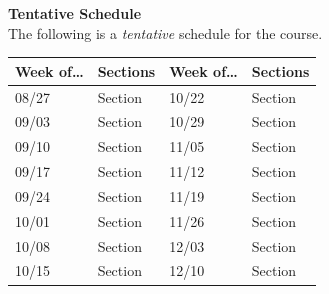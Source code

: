 \documentclass[11pt,letterpaper]{article}
\newcommand{\lefthead}[2]{\noindent\textbf{#1}\hfill\\[#2]}
\begin{document}
\newpage





\lefthead{Tentative Schedule}{0.3cm}
\noindent The following is a \emph{tentative} schedule for the course.
	\begin{table}[H]
	\centering
	\begin{tabular}{l|l || l|l} 
	Week of\dots & Sections & Week of\dots & Sections \\ \hline 
	08/27 & Section & 10/22 & Section \\
	09/03 & Section & 10/29 & Section \\
	09/10 & Section & 11/05 & Section \\ 
	09/17 & Section & 11/12 & Section \\
	09/24 & Section & 11/19 & Section \\
	10/01 & Section & 11/26 & Section \\
	10/08 & Section & 12/03 & Section \\
	10/15 & Section & 12/10 & Section
	\end{tabular}
	\end{table} \vspace{0.3cm}
\end{document}
